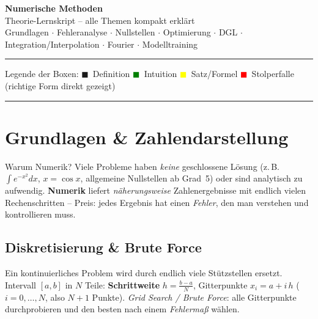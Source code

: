 \documentclass[a4paper,11pt]{article}
\begin{document}
\begin{center}
{\Huge\bfseries\color{accent} Numerische Methoden}\\[4pt]
{\large\color{fgtext} Theorie-Lernskript -- alle Themen kompakt erklärt}\\[3pt]
{\small\color{muted} Grundlagen $\cdot$ Fehleranalyse $\cdot$ Nullstellen $\cdot$ Optimierung $\cdot$ DGL $\cdot$ Integration/Interpolation $\cdot$ Fourier $\cdot$ Modelltraining}
\end{center}
\vspace{2pt}
\noindent\textcolor{rulecol}{\rule{\linewidth}{0.4pt}}

{\small\color{muted} Legende der Boxen:\;
\textcolor{accent}{$\blacksquare$}~Definition \quad
\textcolor{green}{$\blacksquare$}~Intuition \quad
\textcolor{yellow}{$\blacksquare$}~Satz/Formel \quad
\textcolor{red}{$\blacksquare$}~Stolperfalle (richtige Form direkt gezeigt)}

\vspace{4pt}
{\color{muted}\hypersetup{linkcolor=accent}\tableofcontents}
\vspace{6pt}
\noindent\textcolor{rulecol}{\rule{\linewidth}{0.4pt}}

\section{Grundlagen \& Zahlendarstellung}

\begin{intu}{Warum Numerik?}
Viele Probleme haben \emph{keine} geschlossene Lösung (z.\,B.\ $\int e^{-x^2}dx$, $x=\cos x$,
allgemeine Nullstellen ab Grad~5) oder sind analytisch zu aufwendig. \textbf{Numerik} liefert
\emph{näherungsweise} Zahlenergebnisse mit endlich vielen Rechenschritten -- Preis: jedes Ergebnis
hat einen \emph{Fehler}, den man verstehen und kontrollieren muss.
\end{intu}

\subsection{Diskretisierung \& Brute Force}
Ein kontinuierliches Problem wird durch endlich viele Stützstellen ersetzt. Intervall $[a,b]$ in
$N$ Teile: \textbf{Schrittweite} $h=\frac{b-a}{N}$, Gitterpunkte $x_i=a+i\,h$ ($i=0,\dots,N$, also
$N{+}1$ Punkte). \emph{Grid Search / Brute Force}: alle Gitterpunkte durchprobieren und den besten
nach einem \emph{Fehlermaß} wählen.
\end{document}

